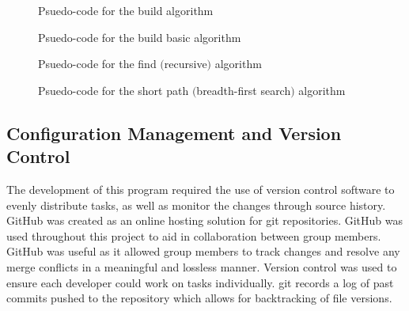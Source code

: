 \documentclass[12pt, a4]{report}
\begin{document}
		\begin{figure}[h]
			
			\caption{Psuedo-code for the build algorithm}
		\end{figure}
		\begin{figure}[!h]
			
			\caption{Psuedo-code for the build basic algorithm}
		\end{figure}
		\begin{figure}[!h]
			
			\caption{Psuedo-code for the find $($recursive$)$ algorithm}
		\end{figure}
		\begin{figure}[!h]
			
			\caption{Psuedo-code for the short path $($breadth-first search$)$ algorithm}
		\end{figure}

	\newpage 
 
	\subsection{Configuration Management and Version Control}
		\par 
		The development of this program required the use of version control software to evenly distribute tasks, as well as monitor the changes through source history. GitHub was created as an online hosting solution for git repositories. GitHub was used throughout this project to aid in collaboration between group members. GitHub was useful as it allowed group members to track changes and resolve any merge conflicts in a meaningful and lossless manner. Version control was used to ensure each developer could work on tasks individually. git records a log of past commits pushed to the repository which allows for backtracking of file versions.
		
\end{document}
